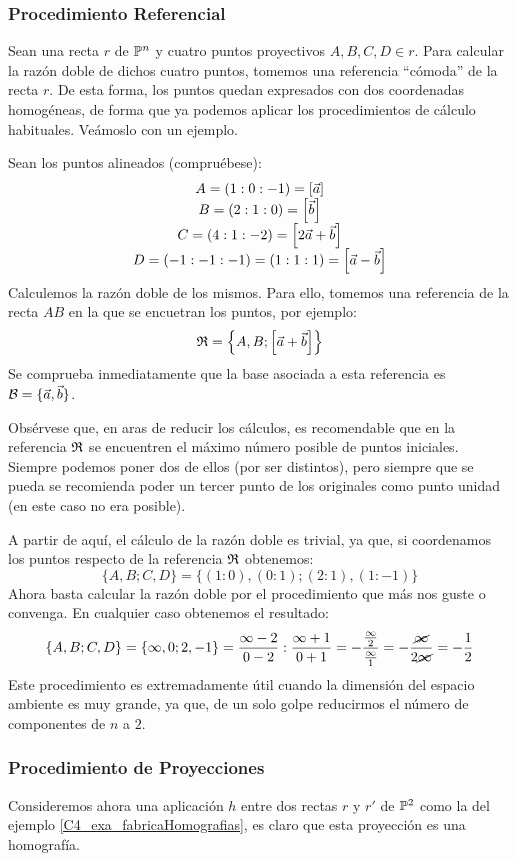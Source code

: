 \subsubsection{Procedimiento Referencial}
Sean una recta $r$ de $\mathbb{P}^n$ y cuatro puntos proyectivos $A,B,C,D\in r$. Para calcular la razón doble de dichos cuatro puntos, tomemos una referencia ``cómoda'' de la recta $r$. De esta forma, los puntos quedan expresados con dos coordenadas homogéneas, de forma que ya podemos aplicar los procedimientos de cálculo habituales. Veámoslo con un ejemplo.
\begin{exa}
	\label{C5_exa_puntosAlineados}
	Sean los puntos alineados (compruébese):
	\[\begin{array}{c}
	A=(1:0:-1)=\left [ \vec{a} \right ]\\
	B=(2:1:0)=\left [ \vec{b} \right ]\\
	C=(4:1:-2)=\left [ 2\vec{a}+\vec{b} \right ]\\
	D=(-1:-1:-1)=(1:1:1)=\left [ \vec{a}-\vec{b} \right ]\\
	\end{array}\]
	Calculemos la razón doble de los mismos. Para ello, tomemos una referencia de la recta $AB$ en la que se encuetran los puntos, por ejemplo: \[\mathfrak{R}=\left\{A,B;\left [ \vec{a}+\vec{b} \right ]\right\}\]
	Se comprueba inmediatamente que la base asociada a esta referencia es $\mathcal{B}=\{\vec{a},\vec{b}\}$.
	
	Obsérvese que, en aras de reducir los cálculos, es recomendable que en la referencia $\mathfrak{R}$ se encuentren el máximo número posible de puntos iniciales. Siempre podemos poner dos de ellos (por ser distintos), pero siempre que se pueda se recomienda poder un tercer punto de los originales como punto unidad (en este caso no era posible). 
	
	A partir de aquí, el cálculo de la razón doble es trivial, ya que, si coordenamos los puntos respecto de la referencia $\mathfrak{R}$ obtenemos:
	\[\{A,B;C,D\}=\{(1:0),(0:1);(2:1),(1:-1)\}\]
	Ahora basta calcular la razón doble por el procedimiento que más nos guste o convenga. En cualquier caso obtenemos el resultado:
	\[\{A,B;C,D\}=\{\infty,0;2,-1\}=\frac{\infty-2}{0-2}:\frac{\infty+1}{0+1}=-\frac{\frac{\infty}{2}}{\frac{\infty}{1}}=-\frac{\cancel{\infty}}{2\cancel{\infty}}=-\frac{1}{2}\]
	Este procedimiento es extremadamente útil cuando la dimensión del espacio ambiente es muy grande, ya que, de un solo golpe reducirmos el número de componentes de $n$ a $2$.
\end{exa}
\subsubsection{Procedimiento de Proyecciones}
Consideremos ahora una aplicación $h$ entre dos rectas $r$ y $r'$ de $\mathbb{P}^2$ como la del ejemplo \ref{C4_exa_fabricaHomografias}, es claro que esta proyección es una homografía.

